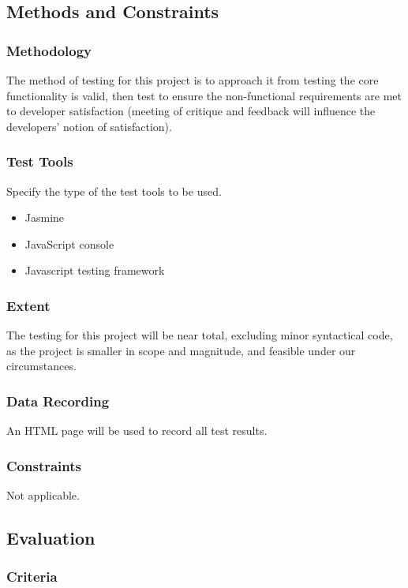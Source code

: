 \documentclass[11pt, oneside]{article}   	%
\begin{document}
\subsection{Methods and Constraints}
\subsubsection{Methodology}
The method of testing for this project is to approach it from testing the core functionality is valid, then test to ensure the non-functional requirements are met to developer satisfaction (meeting of critique and feedback will influence the developers' notion of satisfaction). 

\subsubsection{Test Tools}
Specify the type of the test tools to be used.
\begin{itemize}
\item Jasmine
\item JavaScript console
\item Javascript testing framework
\end{itemize}

\subsubsection{Extent}
The testing for this project will be near total, excluding minor syntactical code, as the project is smaller in scope and magnitude, and feasible under our circumstances.

\subsubsection{Data Recording}
An HTML page will be used to record all test results. 

\subsubsection{Constraints}
Not applicable.

\subsection{Evaluation}
\subsubsection{Criteria}
\end{document}
